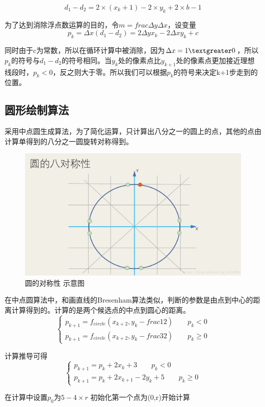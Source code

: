 \documentclass[a4paper,UTF8]{article}
\theoremstyle{definition}
\begin{document}
\begin{equation}
d_{1}-d_{2}=2 \times (x_{k}+1)-2 \times y_{k}+2 \times b -1
\end{equation}

\par 为了达到消除浮点数运算的目的，令$m=frac{\Delta y}{\Delta x}$，设变量
\begin{equation}
p_{k}=\Delta x (d_{1}-d_{2})=2\Delta y x_{k}-2\Delta x y_{k}+c
\end{equation}
\par 同时由于c为常数，所以在循环计算中被消除，因为$\Delta x=1 \textgreater 0$，所以$p_{k}$的符号与$d_{1}-d_{2}$的符号相同。当$y_{k}$处的像素点比$y_{k+1}$处的像素点更加接近理想线段时，$p_{k}<0$，反之则大于零。所以我们可以根据$p_{k}$的符号来决定k+1步走到的位置。
\par 

\subsection{圆形绘制算法}
采用中点圆生成算法，为了简化运算，只计算出八分之一的圆上的点，其他的点由计算单得到的八分之一圆旋转对称得到。
\begin{figure}[ht]
\centering
\includegraphics[width=12cm]{x2.png}
\caption{圆的对称性 示意图}
\label{x2}
\end{figure}
\par 在中点圆算法中，和画直线的Bresenham算法类似，判断的参数是由点到中心的距离计算得到的。计算的是两个候选点的中点到圆心的距离。
\begin{equation}
\left\{
\begin{aligned}
p_{k+1}=f_{circle}(x_{k+2},y_{k}-frac{1}{2}) \qquad p_{k}<0\\
p_{k+1}=f_{circle}(x_{k+2},y_{k}-frac{3}{2}) \qquad p_{k}\geq 0
\end{aligned}
\right.
\end{equation}
\par 计算推导可得
\begin{equation}
\left\{
\begin{aligned}
p_{k+1}=p_{k}+2x_{k}+3 \qquad p_{k}<0\\
p_{k+1}=p_{k}+2x_{k+1}-2y_{k}+5 \qquad p_{k}\geq 0
\end{aligned}
\right.
\end{equation}
\par 在计算中设置$p_{0}$为$5-4\times r$ 初始化第一个点为(0,r)开始计算
\end{document}
